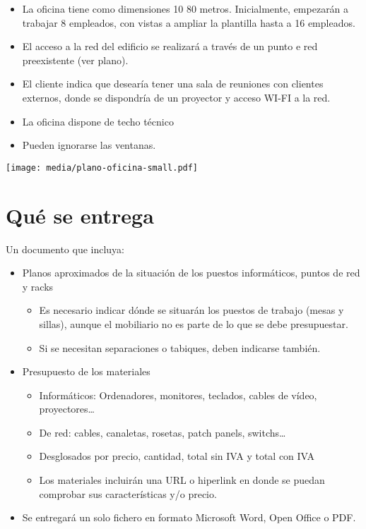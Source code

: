 \documentclass{article}
\renewcommand{\includegraphics}[2][]{\IfFileExists{#2.pdf}{\originalincludegraphics[#1]{#2.pdf}}{\originalincludegraphics[#1]{#2}}}
\begin{document}
\begin{itemize}
\item La oficina tiene como dimensiones 10 \texttimes{} 80  metros. Inicialmente, empezarán a trabajar 8 empleados, con vistas a  ampliar la plantilla hasta a 16 empleados.
\item El acceso a la red del edificio se realizará a través de un punto e red preexistente (ver plano).
\item El cliente indica que desearía tener una sala de reuniones con clientes externos, donde se dispondría de un proyector y acceso WI-FI a la red.
\item La oficina dispone de techo técnico
\item Pueden ignorarse las ventanas.
\end{itemize}


\begin{center}
\texttt{[image: media/plano-oficina-small.pdf]}
\end{center}



\section{Qué se entrega}
\label{sec:org0000006}
Un documento que incluya:
\begin{itemize}
\item Planos aproximados de la situación de los puestos informáticos, puntos de red y racks
\begin{itemize}
\item Es necesario indicar dónde se situarán los puestos de trabajo (mesas y sillas), aunque el mobiliario no es
parte de lo que se debe presupuestar.
\item Si se necesitan separaciones o tabiques, deben indicarse también.
\end{itemize}
\item Presupuesto de los materiales
\begin{itemize}
\item Informáticos: Ordenadores, monitores, teclados, cables de vídeo, proyectores\ldots{}
\item De red: cables, canaletas, rosetas, patch panels, switchs…
\item Desglosados por precio, cantidad, total sin IVA y total con IVA
\item Los materiales incluirán una URL o hiperlink en donde se puedan comprobar sus características y/o precio.
\end{itemize}
\item Se entregará un solo fichero en formato Microsoft Word, Open Office o PDF.
\end{itemize}
\end{document}
